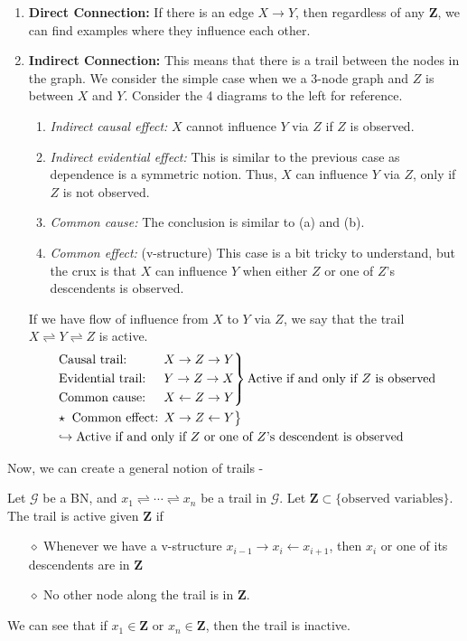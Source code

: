 \begin{enumerate}
	\item \textbf{Direct Connection:} If there is an edge $X \to Y$, then regardless of any $\mathbf Z$, we can find examples where they influence each other.
	\item \textbf{Indirect Connection:} This means that there is a trail between the nodes in the graph. We consider the simple case when we a 3-node graph and $Z$ is between $X$ and $Y$. Consider the 4 diagrams to the left for reference.
	\begin{enumerate}
		\item \textit{Indirect causal effect:} $X$ cannot influence $Y$ via $Z$ if $Z$ is observed.
		\item \textit{Indirect evidential effect:} This is similar to the previous case as dependence is a symmetric notion. Thus, $X$ can influence $Y$ via $Z$, only if $Z$ is not observed.
		\item \textit{Common cause:} The conclusion is similar to (a) and (b).
		\item \textit{Common effect:} (v-structure) This case is a bit tricky to understand, but the crux is that $X$ can influence $Y$ when either $Z$ or one of $Z$'s descendents is observed.
	\end{enumerate}
If we have flow of influence from $X$ to $Y$ via $Z$, we say that the trail $X \rightleftharpoons Y \rightleftharpoons Z$ is active.
	\begin{equation}\label{eqn:dsep}
	\begin{split}
	&\begin{rcases}
		\text{Causal trail: }& X \to Z \to Y\\
		\text{Evidential trail: }&Y \to Z \to X \\
		\text{Common cause: }& X \leftarrow Z \to Y \\
	\end{rcases} \text{Active if and only if $Z$ is observed}\\
&\begin{rcases}
	\star \;\;	\text{Common effect: } X \to Z \leftarrow Y
\end{rcases} \\
&\hookrightarrow \text{Active if and only if $Z$ or one of $Z$'s descendent is observed}
	\end{split}
	\end{equation}
\end{enumerate}
Now, we can create a general notion of trails -
\begin{defn}
Let $\mathcal G$ be a BN, and $x_1 \rightleftharpoons \cdots \rightleftharpoons x_n$ be a trail in $\mathcal G$. Let $\mathbf Z \subset \{\text{observed variables}\}$. The trail is active given $\mathbf Z$ if
\begin{itemize}[leftmargin=1cm]
	\item[$\diamond$] Whenever we have a v-structure $x_{i-1} \to x_i \leftarrow x_{i+1}$, then $x_i$ or one of its descendents are in $\mathbf Z$
	\item[$\diamond$] No other node along the trail is in $\mathbf Z$.
\end{itemize}
We can see that if $x_1 \in \mathbf Z$ or $x_n \in \mathbf Z$, then the trail is inactive.
\end{defn}
